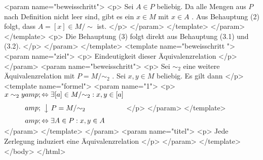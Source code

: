          <param name="beweisschritt">
          <p>
           Sei
           $A\in P$
           beliebig. Da alle Mengen aus
           $P$
           nach Definition nicht leer sind, gibt es ein
           $x\in M$
           mit
           $x\in A$
           . Aus Behauptung (2) folgt, dass
           $A=[x]\in M/{\sim}$
           ist.
          </p>
         </param>
        </template>
       </param>
      </template>
      <p>
       Die Behauptung (3) folgt direkt aus Behauptung (3.1) und (3.2).
      </p>
     </param>
    </template>
    <template name="beweisschritt
 ">
     <param name="ziel">
      <p>
       Eindeutigkeit dieser Äquivalenzrelation
      </p>
     </param>
     <param name="beweisschritt">
      <p>
       Sei
       $\sim_2$
       eine weitere Äquivalenzrelation mit
       $P=M/{\sim_2}$
       . Sei
       $x,y\in M$
       beliebig. Es gilt dann
      </p>
      <template name="formel">
       <param name="1">
        <p>
         $\begin{align} x\sim_2 y &amp; \Leftrightarrow \exists [a] \in M/{\sim_2}: x,y\in [a] \\[0.3em] &amp; \ \left\downarrow\ P=M/{\sim_2}\right.\\[0.3em] &amp; \Leftrightarrow \exists A\in P: x,y\in A \end{align}$
        </p>
       </param>
      </template>
     </param>
    </template>
   </param>
   <param name="titel">
    <p>
     Jede Zerlegung induziert eine Äquivalenzrelation
    </p>
   </param>
  </template>
 </body>
</html>
